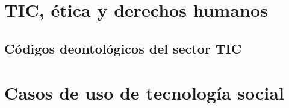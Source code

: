 \documentclass[a4paper]{book}
\begin{document}
\chapter{TIC, ética y derechos humanos}
\section{Códigos deontológicos del sector TIC}

\chapter{Casos de uso de tecnología social}


% 
\end{document}

